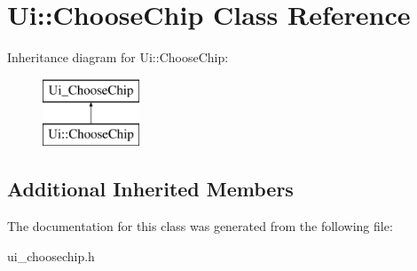 \hypertarget{classUi_1_1ChooseChip}{\section{Ui\-:\-:Choose\-Chip Class Reference}
\label{classUi_1_1ChooseChip}
}
Inheritance diagram for Ui\-:\-:Choose\-Chip\-:\begin{figure}[H]
\begin{center}
\leavevmode
\includegraphics[height=2.000000cm]{classUi_1_1ChooseChip}
\end{center}
\end{figure}
\subsection*{Additional Inherited Members}


The documentation for this class was generated from the following file\-:\begin{DoxyCompactItemize}
\item 
ui\-\_\-choosechip.\-h\end{DoxyCompactItemize}
